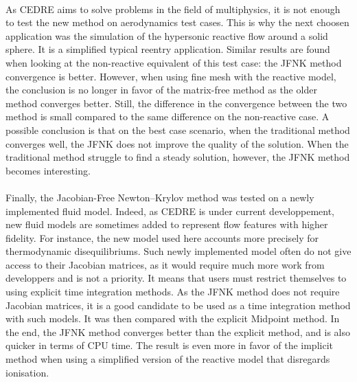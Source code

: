     \paragraph{}
    As CEDRE aims to solve problems in the field of multiphysics, it is not enough to test the new method on aerodynamics test cases.
    This is why the next choosen application was the simulation of the hypersonic reactive flow around a solid sphere.
    It is a simplified typical reentry application.
    Similar results are found when looking at the non-reactive equivalent of this test case: the JFNK method convergence is better.
    However, when using fine mesh with the reactive model, the conclusion is no longer in favor of the matrix-free method as the older method converges better.
    Still, the difference in the convergence between the two method is small compared to the same difference on the non-reactive case.
    A possible conclusion is that on the best case scenario, when the traditional method converges well, the JFNK does not improve the quality of the solution.
    When the traditional method struggle to find a steady solution, however, the JFNK method becomes interesting.

    \paragraph{}
    Finally, the Jacobian-Free Newton--Krylov method was tested on a newly implemented fluid model.
    Indeed, as CEDRE is under current developpement, new fluid models are sometimes added to represent flow features with higher fidelity.
    For instance, the new model used here accounts more precisely for thermodynamic disequilibriums.
    Such newly implemented model often do not give access to their Jacobian matrices, as it would require much more work from developpers and is not a priority.
    It means that users must restrict themselves to using explicit time integration methods.
    As the JFNK method does not require Jacobian matrices, it is a good candidate to be used as a time integration method with such models.
    It was then compared with the explicit Midpoint method.
    In the end, the JFNK method converges better than the explicit method, and is also quicker in terms of CPU time.
    The result is even more in favor of the implicit method when using a simplified version of the reactive model that disregards ionisation.

